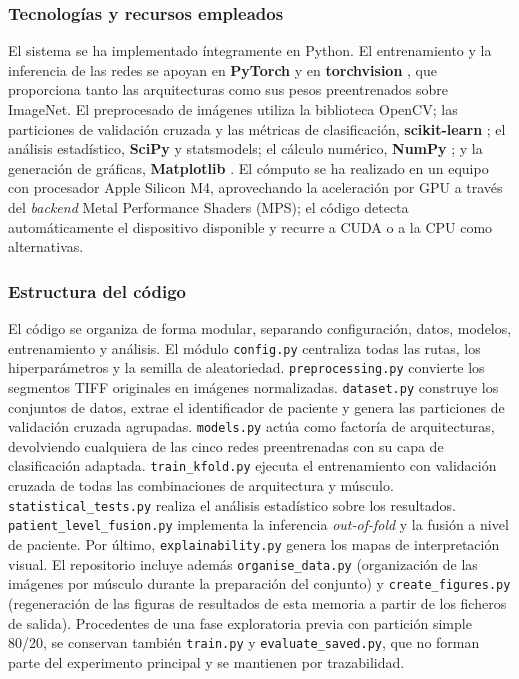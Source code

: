 \documentclass[12pt]{extarticle}
\numberwithin{equation}{section}
\begin{document}
\begin{refsection}
\subsubsection{Tecnologías y recursos empleados}

El sistema se ha implementado íntegramente en Python. El entrenamiento y la inferencia de las redes se apoyan en \textbf{PyTorch} \cite{paszke2019pytorch} y en \textbf{torchvision} \cite{marcel2010torchvision}, que proporciona tanto las arquitecturas como sus pesos preentrenados sobre ImageNet. El preprocesado de imágenes utiliza la biblioteca OpenCV; las particiones de validación cruzada y las métricas de clasificación, \textbf{scikit-learn} \cite{pedregosa2011scikit}; el análisis estadístico, \textbf{SciPy} \cite{virtanen2020scipy} y statsmodels; el cálculo numérico, \textbf{NumPy} \cite{harris2020array}; y la generación de gráficas, \textbf{Matplotlib} \cite{hunter2007matplotlib}. El cómputo se ha realizado en un equipo con procesador Apple Silicon M4, aprovechando la aceleración por GPU a través del \textit{backend} Metal Performance Shaders (MPS); el código detecta automáticamente el dispositivo disponible y recurre a CUDA o a la CPU como alternativas.

\subsubsection{Estructura del código}

El código se organiza de forma modular, separando configuración, datos, modelos, entrenamiento y análisis. El módulo \texttt{config.py} centraliza todas las rutas, los hiperparámetros y la semilla de aleatoriedad. \texttt{preprocessing.py} convierte los segmentos TIFF originales en imágenes normalizadas. \texttt{dataset.py} construye los conjuntos de datos, extrae el identificador de paciente y genera las particiones de validación cruzada agrupadas. \texttt{models.py} actúa como factoría de arquitecturas, devolviendo cualquiera de las cinco redes preentrenadas con su capa de clasificación adaptada. \texttt{train\_\allowbreak kfold.py} ejecuta el entrenamiento con validación cruzada de todas las combinaciones de arquitectura y músculo. \texttt{statistical\_\allowbreak tests.py} realiza el análisis estadístico sobre los resultados. \texttt{patient\_\allowbreak level\_\allowbreak fusion.py} implementa la inferencia \textit{out-of-fold} y la fusión a nivel de paciente. Por último, \texttt{explainability.py} genera los mapas de interpretación visual. El repositorio incluye además \texttt{organise\_data.py} (organización de las imágenes por músculo durante la preparación del conjunto) y \texttt{create\_figures.py} (regeneración de las figuras de resultados de esta memoria a partir de los ficheros de salida). Procedentes de una fase exploratoria previa con partición simple 80/20, se conservan también \texttt{train.py} y \texttt{evaluate\_saved.py}, que no forman parte del experimento principal y se mantienen por trazabilidad.


\end{refsection}
\end{document}
